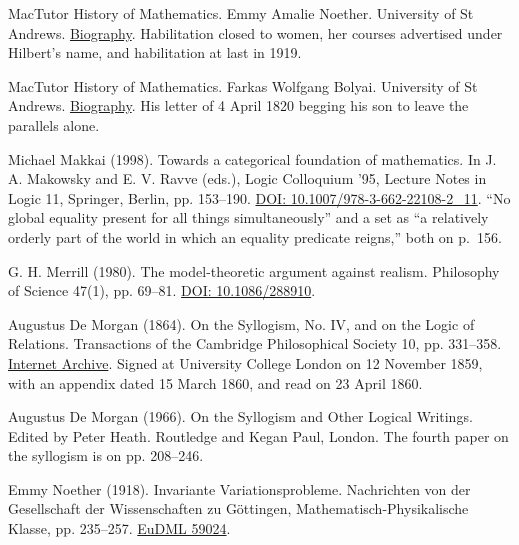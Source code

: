 \noindent MacTutor History of Mathematics. Emmy Amalie Noether. University of St Andrews. \href{https://mathshistory.st-andrews.ac.uk/Biographies/Noether_Emmy/}{Biography}. Habilitation closed to women, her courses advertised under Hilbert's name, and habilitation at last in 1919.
\par\medskip

\noindent MacTutor History of Mathematics. Farkas Wolfgang Bolyai. University of St Andrews. \href{https://mathshistory.st-andrews.ac.uk/Biographies/Bolyai_Farkas/}{Biography}. His letter of 4 April 1820 begging his son to leave the parallels alone.
\par\medskip

\noindent Michael Makkai (1998). Towards a categorical foundation of mathematics. In J. A. Makowsky and E. V. Ravve (eds.), Logic Colloquium '95, Lecture Notes in Logic 11, Springer, Berlin, pp. 153--190. \href{https://doi.org/10.1007/978-3-662-22108-2_11}{DOI: 10.1007/978-3-662-22108-2\_11}. ``No global equality present for all things simultaneously'' and a set as ``a relatively orderly part of the world in which an equality predicate reigns,'' both on p.~156.
\par\medskip

\noindent G. H. Merrill (1980). The model-theoretic argument against realism. Philosophy of Science 47(1), pp. 69--81. \href{https://doi.org/10.1086/288910}{DOI: 10.1086/288910}.
\par\medskip

\noindent Augustus De Morgan (1864). On the Syllogism, No. IV, and on the Logic of Relations. Transactions of the Cambridge Philosophical Society 10, pp. 331--358. \href{https://archive.org/details/transactionsofca10camb}{Internet Archive}. Signed at University College London on 12 November 1859, with an appendix dated 15 March 1860, and read on 23 April 1860.
\par\medskip

\noindent Augustus De Morgan (1966). On the Syllogism and Other Logical Writings. Edited by Peter Heath. Routledge and Kegan Paul, London. The fourth paper on the syllogism is on pp. 208--246.
\par\medskip

\noindent Emmy Noether (1918). Invariante Variationsprobleme. Nachrichten von der Gesellschaft der Wissenschaften zu G\"ottingen, Mathematisch-Physikalische Klasse, pp. 235--257. \href{https://eudml.org/doc/59024}{EuDML 59024}.
\par\medskip

